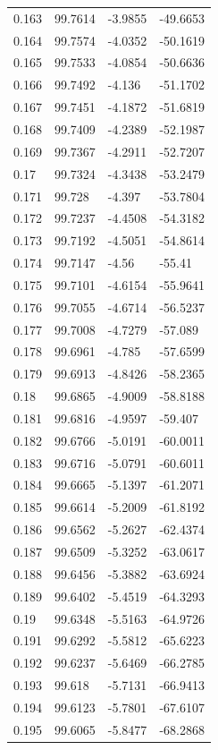 \begin{tabular}{llll}
0.163 & 99.7614 & -3.9855 & -49.6653 \\
0.164 & 99.7574 & -4.0352 & -50.1619 \\
0.165 & 99.7533 & -4.0854 & -50.6636 \\
0.166 & 99.7492 & -4.136 & -51.1702 \\
0.167 & 99.7451 & -4.1872 & -51.6819 \\
0.168 & 99.7409 & -4.2389 & -52.1987 \\
0.169 & 99.7367 & -4.2911 & -52.7207 \\
0.17 & 99.7324 & -4.3438 & -53.2479 \\
0.171 & 99.728 & -4.397 & -53.7804 \\
0.172 & 99.7237 & -4.4508 & -54.3182 \\
0.173 & 99.7192 & -4.5051 & -54.8614 \\
0.174 & 99.7147 & -4.56 & -55.41 \\
0.175 & 99.7101 & -4.6154 & -55.9641 \\
0.176 & 99.7055 & -4.6714 & -56.5237 \\
0.177 & 99.7008 & -4.7279 & -57.089 \\
0.178 & 99.6961 & -4.785 & -57.6599 \\
0.179 & 99.6913 & -4.8426 & -58.2365 \\
0.18 & 99.6865 & -4.9009 & -58.8188 \\
0.181 & 99.6816 & -4.9597 & -59.407 \\
0.182 & 99.6766 & -5.0191 & -60.0011 \\
0.183 & 99.6716 & -5.0791 & -60.6011 \\
0.184 & 99.6665 & -5.1397 & -61.2071 \\
0.185 & 99.6614 & -5.2009 & -61.8192 \\
0.186 & 99.6562 & -5.2627 & -62.4374 \\
0.187 & 99.6509 & -5.3252 & -63.0617 \\
0.188 & 99.6456 & -5.3882 & -63.6924 \\
0.189 & 99.6402 & -5.4519 & -64.3293 \\
0.19 & 99.6348 & -5.5163 & -64.9726 \\
0.191 & 99.6292 & -5.5812 & -65.6223 \\
0.192 & 99.6237 & -5.6469 & -66.2785 \\
0.193 & 99.618 & -5.7131 & -66.9413 \\
0.194 & 99.6123 & -5.7801 & -67.6107 \\
0.195 & 99.6065 & -5.8477 & -68.2868 \\

\end{tabular}
